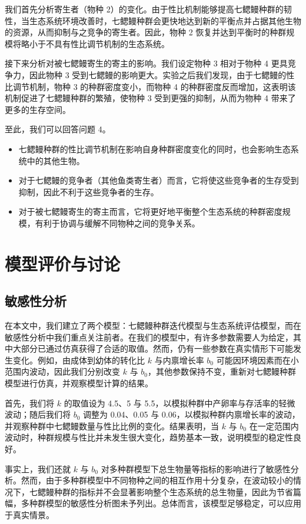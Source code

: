 \documentclass[11pt,a4paper]{ctexart}
\begin{document}
我们首先分析寄生者（物种 2）的变化。由于性比机制能够提高七鳃鳗种群的韧性，当生态系统环境改善时，七鳃鳗种群会更快地达到新的平衡点并占据其他生物的资源，从而抑制与之竞争的寄生者。因此，物种 2 恢复并达到平衡时的种群规模将略小于不具有性比调节机制的生态系统。

接下来分析对被七鳃鳗寄生的寄主的影响。我们设定物种 3 相对于物种 4 更具竞争力，因此物种 3 受到七鳃鳗的影响更大。实验之后我们发现，由于七鳃鳗的性比调节机制，物种 3 的种群密度变小，而物种 4 的种群密度反而增加，这表明该机制促进了七鳃鳗种群的繁殖，使物种 3 受到更强的抑制，从而为物种 4 带来了更多的生存空间。

至此，我们可以回答问题 4。

\begin{itemize}
\item 七鳃鳗种群的性比调节机制在影响自身种群密度变化的同时，也会影响生态系统中的其他生物。
\item 对于七鳃鳗的竞争者（其他鱼类寄生者）而言，它将使这些竞争者的生存受到抑制，因此不利于这些竞争者的生存。
\item 对于被七鳃鳗寄生的寄主而言，它将更好地平衡整个生态系统的种群密度规模，有利于协调与缓解不同物种之间的竞争关系。
\end{itemize}

\section{模型评价与讨论}

\subsection{敏感性分析}

在本文中，我们建立了两个模型：七鳃鳗种群迭代模型与生态系统评估模型，而在敏感性分析中我们重点关注前者。在我们的模型中，有许多参数需要人为给定，其中大部分已通过仿真获得了合适的取值。然而，仍有一些参数在真实情形下可能发生变化。例如，由成体到幼体的转化比 $k$ 与内禀增长率 $b_0$ 可能因环境因素而在小范围内波动，因此我们分别改变 $k$ 与 $b_0$，其他参数保持不变，重新对七鳃鳗种群模型进行仿真，并观察模型计算的结果。

首先，我们将 $k$ 的取值设为 4.5、5 与 5.5，以模拟种群中产卵率与存活率的轻微波动；随后我们将 $b_0$ 调整为 0.04、0.05 与 0.06，以模拟种群内禀增长率的波动，并观察种群中七鳃鳗数量与性比比例的变化。结果表明，当 $k$ 与 $b_0$ 在一定范围内波动时，种群规模与性比并未发生很大变化，趋势基本一致，说明模型的稳定性良好。

事实上，我们还就 $k$ 与 $b_0$ 对多种群模型下总生物量等指标的影响进行了敏感性分析。然而，由于多种群模型中不同物种之间的相互作用十分复杂，在波动较小的情况下，七鳃鳗种群的指标并不会显著影响整个生态系统的总生物量，因此为节省篇幅，多种群模型的敏感性分析图未予列出。总体而言，该模型足够稳定，可以应用于真实情景。
\end{document}
